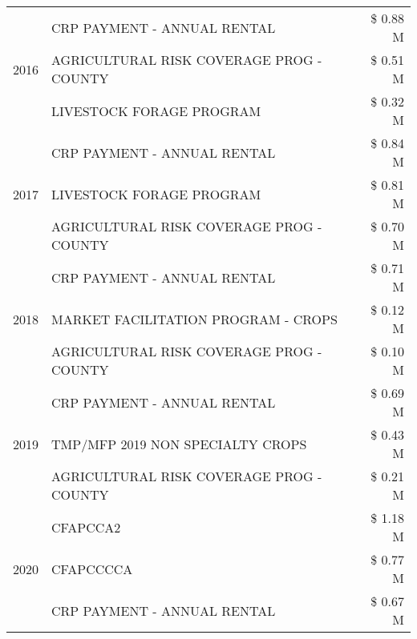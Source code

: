 \begin{tabular}{llr}
\cline{1-3}
\multirow[t]{3}{*}{2016} & CRP PAYMENT - ANNUAL RENTAL & \$ 0.88 M \\
 & AGRICULTURAL RISK COVERAGE PROG - COUNTY & \$ 0.51 M \\
 & LIVESTOCK FORAGE PROGRAM & \$ 0.32 M \\
\cline{1-3}
\multirow[t]{3}{*}{2017} & CRP PAYMENT - ANNUAL RENTAL & \$ 0.84 M \\
 & LIVESTOCK FORAGE PROGRAM & \$ 0.81 M \\
 & AGRICULTURAL RISK COVERAGE PROG - COUNTY & \$ 0.70 M \\
\cline{1-3}
\multirow[t]{3}{*}{2018} & CRP PAYMENT - ANNUAL RENTAL & \$ 0.71 M \\
 & MARKET FACILITATION PROGRAM - CROPS & \$ 0.12 M \\
 & AGRICULTURAL RISK COVERAGE PROG - COUNTY & \$ 0.10 M \\
\cline{1-3}
\multirow[t]{3}{*}{2019} & CRP PAYMENT - ANNUAL RENTAL & \$ 0.69 M \\
 & TMP/MFP 2019 NON SPECIALTY CROPS & \$ 0.43 M \\
 & AGRICULTURAL RISK COVERAGE PROG - COUNTY & \$ 0.21 M \\
\cline{1-3}
\multirow[t]{3}{*}{2020} & CFAPCCA2 & \$ 1.18 M \\
 & CFAPCCCCA & \$ 0.77 M \\
 & CRP PAYMENT - ANNUAL RENTAL & \$ 0.67 M \\
\cline{1-3}
\bottomrule
\end{tabular}
